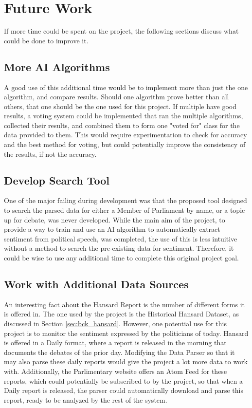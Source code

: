 \section{Future Work}

If more time could be spent on the project, the following sections discuss what could be done to improve it.

\subsection{More AI Algorithms}

A good use of this additional time would be to implement more than just the one algorithm, and compare results. Should one algorithm prove better than all others, that one should be the one used for this project. If multiple have good results, a voting system could be implemented that ran the multiple algorithms, collected their results, and combined them to form one "voted for" class for the data provided to them. This would require experimentation to check for accuracy and the best method for voting, but could potentially improve the consistency of the results, if not the accuracy.

\subsection{Develop Search Tool}

One of the major failing during development was that the proposed tool designed to search the parsed data for either a Member of Parliament by name, or a topic up for debate, was never developed. While the main aim of the project, to provide a way to train and use an AI algorithm to automatically extract sentiment from political speech, was completed, the use of this is less intuitive without a method to search the pre-existing data for sentiment. Therefore, it could be wise to use any additional time to complete this original project goal.

\subsection{Work with Additional Data Sources}

An interesting fact about the Hansard Report is the number of different forms it is offered in. The one used by the project is the Historical Hansard Dataset, as discussed in Section \ref{sec:bck_hansard}. However, one potential use for this project is to monitor the sentiment expressed by the politicians of today. Hansard is offered in a Daily format, where a report is released in the morning that documents the debates of the prior day. Modifying the Data Parser so that it may also parse these daily reports would give the project a lot more data to work with. Additionally, the Parlimentary website offers an Atom Feed for these reports, which could potentially be subscribed to by the project, so that when a Daily report is released, the parser could automatically download and parse this report, ready to be analyzed by the rest of the system.

